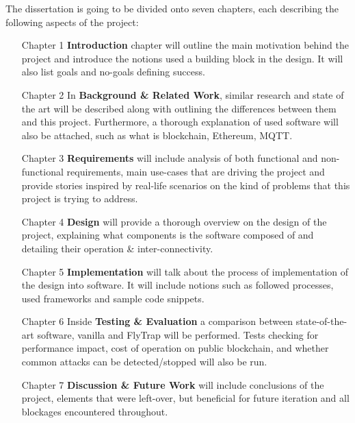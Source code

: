 The dissertation is going to be divided onto seven chapters, each describing the following aspects of the project:
\begin{itemize}[leftmargin=4.5em]
  \item[Chapter 1] \textbf{Introduction} chapter will outline the main motivation behind the project and introduce the notions used a building block in the design. It will also list goals and no-goals defining success.
  \item[Chapter 2] In \textbf{Background \& Related Work}, similar research and state of the art will be described along with outlining the differences between them and this project. Furthermore, a thorough explanation of used software will also be attached, such as what is blockchain, Ethereum, MQTT. 
  \item[Chapter 3] \textbf{Requirements} will include analysis of both functional and non-functional requirements, main use-cases that are driving the project and provide stories inspired by real-life scenarios on the kind of problems that this project is trying to address.
  \item[Chapter 4] \textbf{Design} will provide a thorough overview on the design of the project, explaining what components is the software composed of and detailing their operation \& inter-connectivity.
  \item[Chapter 5] \textbf{Implementation} will talk about the process of implementation of the design into software. It will include notions such as followed processes, used frameworks and sample code snippets.
  \item[Chapter 6] Inside \textbf{Testing \& Evaluation} a comparison between state-of-the-art software, vanilla and FlyTrap will be performed. Tests checking for performance impact, cost of operation on public blockchain, and whether common attacks can be detected/stopped will also be run.
  \item[Chapter 7] \textbf{Discussion \& Future Work} will include conclusions of the project, elements that were left-over, but beneficial for future iteration and all blockages encountered throughout. 
\end{itemize}
